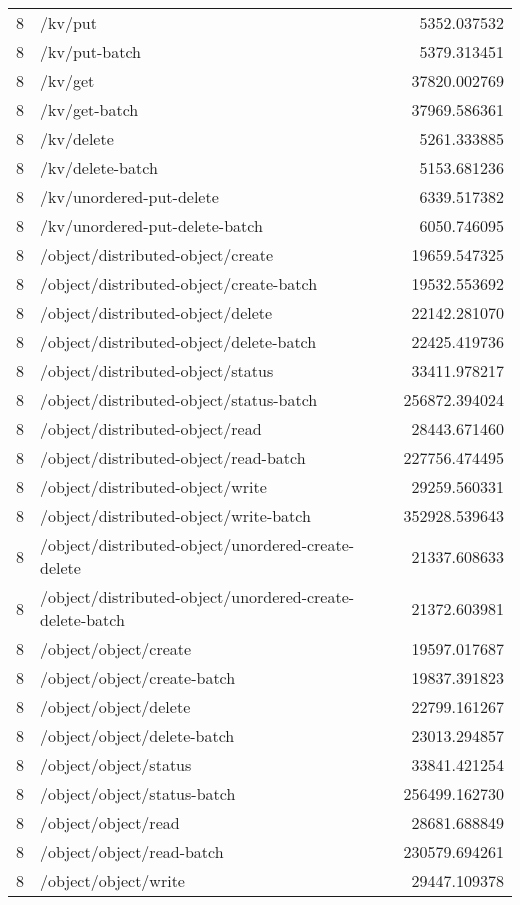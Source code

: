\begin{longtable}{rlr}
8 & /kv/put & 5352.037532 \\
8 & /kv/put-batch & 5379.313451 \\
8 & /kv/get & 37820.002769 \\
8 & /kv/get-batch & 37969.586361 \\
8 & /kv/delete & 5261.333885 \\
8 & /kv/delete-batch & 5153.681236 \\
8 & /kv/unordered-put-delete & 6339.517382 \\
8 & /kv/unordered-put-delete-batch & 6050.746095 \\
8 & /object/distributed-object/create & 19659.547325 \\
8 & /object/distributed-object/create-batch & 19532.553692 \\
8 & /object/distributed-object/delete & 22142.281070 \\
8 & /object/distributed-object/delete-batch & 22425.419736 \\
8 & /object/distributed-object/status & 33411.978217 \\
8 & /object/distributed-object/status-batch & 256872.394024 \\
8 & /object/distributed-object/read & 28443.671460 \\
8 & /object/distributed-object/read-batch & 227756.474495 \\
8 & /object/distributed-object/write & 29259.560331 \\
8 & /object/distributed-object/write-batch & 352928.539643 \\
8 & /object/distributed-object/unordered-create-delete & 21337.608633 \\
8 & /object/distributed-object/unordered-create-delete-batch & 21372.603981 \\
8 & /object/object/create & 19597.017687 \\
8 & /object/object/create-batch & 19837.391823 \\
8 & /object/object/delete & 22799.161267 \\
8 & /object/object/delete-batch & 23013.294857 \\
8 & /object/object/status & 33841.421254 \\
8 & /object/object/status-batch & 256499.162730 \\
8 & /object/object/read & 28681.688849 \\
8 & /object/object/read-batch & 230579.694261 \\
8 & /object/object/write & 29447.109378 \\

\end{longtable}
